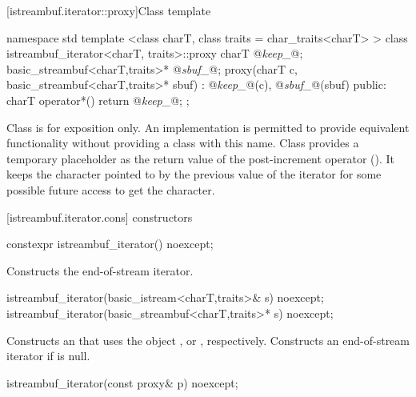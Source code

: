 [istreambuf.iterator::proxy]{Class template }

%
\begin{codeblock}
namespace std {
  template <class charT, class traits = char_traits<charT> >
  class istreambuf_iterator<charT, traits>::proxy {
    charT @\textit{keep_}@;
    basic_streambuf<charT,traits>* @\textit{sbuf_}@;
    proxy(charT c,
      basic_streambuf<charT,traits>* sbuf)
      : @\textit{keep_}@(c), @\textit{sbuf_}@(sbuf) { }
  public:
    charT operator*() { return @\textit{keep_}@; }
  };
}
\end{codeblock}

\pnum
Class
is for exposition only.
An implementation is permitted to provide equivalent functionality without
providing a class with this name.
Class
provides a temporary
placeholder as the return value of the post-increment operator
().
It keeps the character pointed to by the previous value
of the iterator for some possible future access to get the character.

[istreambuf.iterator.cons]{ constructors}


%
\begin{itemdecl}
constexpr istreambuf_iterator() noexcept;
\end{itemdecl}

\begin{itemdescr}
\pnum
\effects
Constructs the end-of-stream iterator.
\end{itemdescr}


%
\begin{itemdecl}
istreambuf_iterator(basic_istream<charT,traits>& s) noexcept;
istreambuf_iterator(basic_streambuf<charT,traits>* s) noexcept;
\end{itemdecl}

\begin{itemdescr}
\pnum
\effects
Constructs an
that uses the
object
,
or
,
respectively.
Constructs an end-of-stream iterator if
is null.
\end{itemdescr}


%
\begin{itemdecl}
istreambuf_iterator(const proxy& p) noexcept;
\end{itemdecl}

